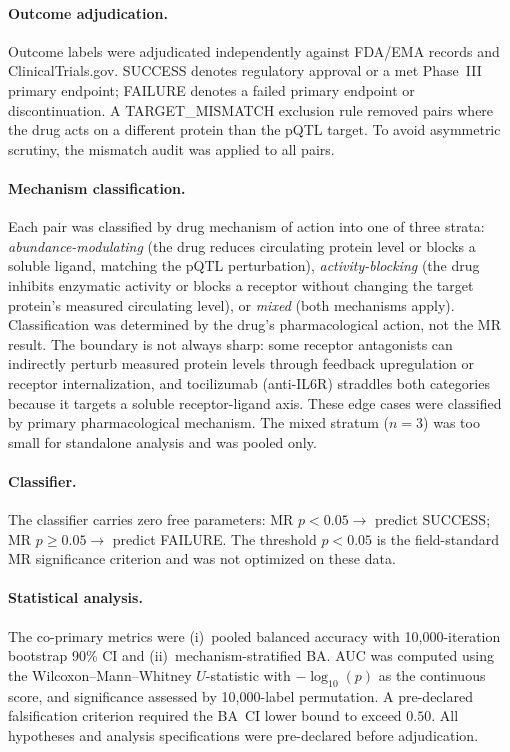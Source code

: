 \documentclass[11pt]{article}
\begin{document}
\paragraph{Outcome adjudication.}
Outcome labels were adjudicated independently against FDA/EMA records and ClinicalTrials.gov. SUCCESS denotes regulatory approval or a met Phase~III primary endpoint; FAILURE denotes a failed primary endpoint or discontinuation. A TARGET\_MISMATCH exclusion rule removed pairs where the drug acts on a different protein than the pQTL target. To avoid asymmetric scrutiny, the mismatch audit was applied to all pairs.

\paragraph{Mechanism classification.}
Each pair was classified by drug mechanism of action into one of three strata: \emph{abundance-modulating} (the drug reduces circulating protein level or blocks a soluble ligand, matching the pQTL perturbation), \emph{activity-blocking} (the drug inhibits enzymatic activity or blocks a receptor without changing the target protein's measured circulating level), or \emph{mixed} (both mechanisms apply). Classification was determined by the drug's pharmacological action, not the MR result. The boundary is not always sharp: some receptor antagonists can indirectly perturb measured protein levels through feedback upregulation or receptor internalization, and tocilizumab (anti-IL6R) straddles both categories because it targets a soluble receptor-ligand axis. These edge cases were classified by primary pharmacological mechanism. The mixed stratum ($n = 3$) was too small for standalone analysis and was pooled only.

\paragraph{Classifier.}
The classifier carries zero free parameters: MR $p < 0.05 \rightarrow$ predict SUCCESS; MR $p \geq 0.05 \rightarrow$ predict FAILURE. The threshold $p < 0.05$ is the field-standard MR significance criterion and was not optimized on these data.

\paragraph{Statistical analysis.}
The co-primary metrics were (i)~pooled balanced accuracy with 10{,}000-iteration bootstrap 90\% CI and (ii)~mechanism-stratified BA. AUC was computed using the Wilcoxon--Mann--Whitney $U$-statistic with $-\log_{10}(p)$ as the continuous score, and significance assessed by 10{,}000-label permutation. A pre-declared falsification criterion required the BA~CI lower bound to exceed $0.50$. All hypotheses and analysis specifications were pre-declared before adjudication.
\end{document}
